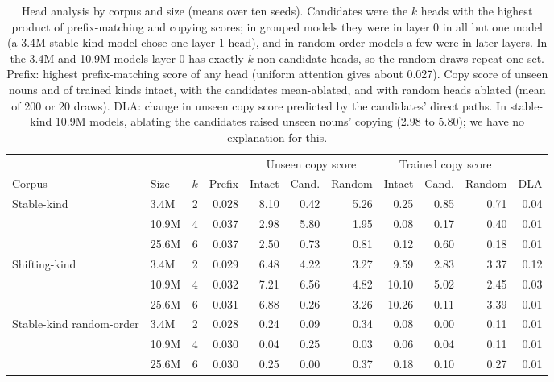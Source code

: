\begin{table}[!htbp]
\centering\small
\caption{Head analysis by corpus and size (means over ten seeds). Candidates were the $k$ heads with the highest product of prefix-matching and copying scores; in grouped models they were in layer 0 in all but one model (a 3.4M stable-kind model chose one layer-1 head), and in random-order models a few were in later layers. In the 3.4M and 10.9M models layer 0 has exactly $k$ non-candidate heads, so the random draws repeat one set. Prefix: highest prefix-matching score of any head (uniform attention gives about 0.027). Copy score of unseen nouns and of trained kinds intact, with the candidates mean-ablated, and with random heads ablated (mean of 200 or 20 draws). DLA: change in unseen copy score predicted by the candidates' direct paths. In stable-kind 10.9M models, ablating the candidates raised unseen nouns' copying (2.98 to 5.80); we have no explanation for this.}
\label{tab:M4}
\begin{tabular}{@{}llrrrrrrrrr@{}}
\toprule
 & & & & \multicolumn{3}{c}{Unseen copy score} & \multicolumn{3}{c}{Trained copy score} & \\
\cmidrule(lr){5-7}\cmidrule(lr){8-10}
Corpus & Size & $k$ & Prefix & Intact & Cand. & Random & Intact & Cand. & Random & DLA \\
\midrule
Stable-kind & 3.4M & 2 & 0.028 & 8.10 & \textminus{}0.42 & 5.26 & \textminus{}0.25 & \textminus{}0.85 & \textminus{}0.71 & \textminus{}0.04 \\
 & 10.9M & 4 & 0.037 & 2.98 & 5.80 & 1.95 & 0.08 & 0.17 & \textminus{}0.40 & \textminus{}0.01 \\
 & 25.6M & 6 & 0.037 & 2.50 & 0.73 & 0.81 & 0.12 & \textminus{}0.60 & \textminus{}0.18 & \textminus{}0.01 \\
Shifting-kind & 3.4M & 2 & 0.029 & 6.48 & 4.22 & 3.27 & 9.59 & 2.83 & 3.37 & \textminus{}0.12 \\
 & 10.9M & 4 & 0.032 & 7.21 & 6.56 & 4.82 & 10.10 & 5.02 & 2.45 & \textminus{}0.03 \\
 & 25.6M & 6 & 0.031 & 6.88 & 0.26 & 3.26 & 10.26 & \textminus{}0.11 & 3.39 & \textminus{}0.01 \\
Stable-kind random-order & 3.4M & 2 & 0.028 & \textminus{}0.24 & \textminus{}0.09 & \textminus{}0.34 & \textminus{}0.08 & 0.00 & \textminus{}0.11 & \textminus{}0.01 \\
 & 10.9M & 4 & 0.030 & 0.04 & 0.25 & 0.03 & \textminus{}0.06 & 0.04 & \textminus{}0.11 & \textminus{}0.01 \\
 & 25.6M & 6 & 0.030 & \textminus{}0.25 & 0.00 & \textminus{}0.37 & \textminus{}0.18 & \textminus{}0.10 & \textminus{}0.27 & \textminus{}0.01 \\
\bottomrule
\end{tabular}
\end{table}


